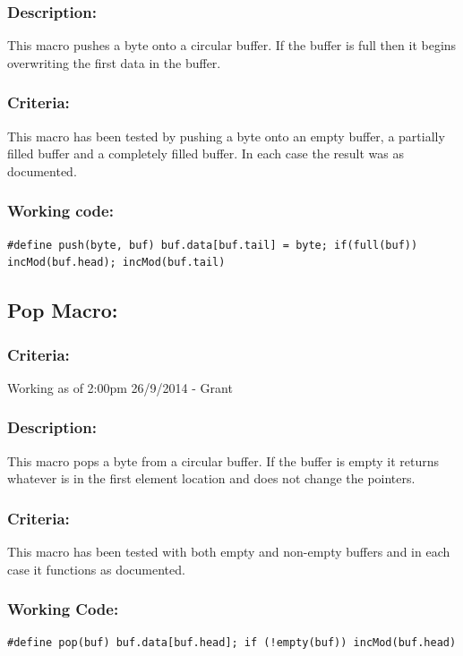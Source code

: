 \documentclass[]{report}
\begin{document}
\subsubsection{Description:}
This macro pushes a byte onto a circular buffer. If the buffer is full then it begins overwriting the first data in the buffer.

\subsubsection{Criteria:}
This macro has been tested by pushing a byte onto an empty buffer, a partially filled buffer and a completely filled buffer. In each case the result was as documented.

\subsubsection{Working code:}
\begin{lstlisting}
#define push(byte, buf) buf.data[buf.tail] = byte; if(full(buf)) incMod(buf.head); incMod(buf.tail)
\end{lstlisting}

\subsection{Pop Macro:}
\subsubsection{Criteria:}
Working as of 2:00pm 26/9/2014 - Grant

\subsubsection{Description:}
This macro pops a byte from a circular buffer. If the buffer is empty it returns whatever is in the first element location and does not change the pointers.

\subsubsection{Criteria:}
This macro has been tested with both empty and non-empty buffers and in each case it functions as documented.

\subsubsection{Working Code:}
\begin{lstlisting}
#define pop(buf) buf.data[buf.head]; if (!empty(buf)) incMod(buf.head)
\end{lstlisting}
\end{document}
